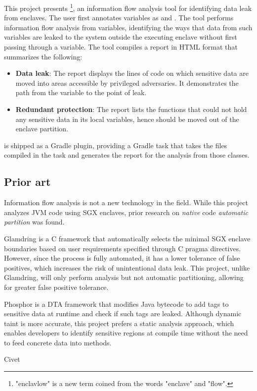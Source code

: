 This project presents \pname{}
\footnote{"enclavlow" is a new term coined from the words "enclave" and "flow".},
an information flow analysis tool
for identifying data leak from enclaves.
The user first annotates variables as  and .
The tool performs information flow analysis from  variables,
identifying the ways that data from such variables are leaked
to the system outside the executing enclave
without first passing through a  variable.
The tool compiles a report in HTML format that summarizes the following:
\begin{itemize}
	\item \textbf{Data leak}:
		The report displays the lines of code on which sensitive data are moved
		into areas accessible by privileged adversaries.
		It demonstrates the path from the  variable to the point of leak.
	\item \textbf{Redundant protection}:
		The report lists the functions that could not hold any sensitive data in its local variables,
		hence should be moved out of the enclave partition.
\end{itemize}

\pname{} is shipped as a Gradle plugin,
providing a Gradle task that
takes the  files compiled in the  task
and generates the report for the analysis from those classes.

\subsection{Prior art}
Information flow analysis is not a new technology in the field.
While this project analyzes JVM code using SGX enclaves,
prior research on \emph{native} code \emph{automatic partition} was found.

Glamdring \cite{glamdring} is a C framework that
automatically selects the minimal SGX enclave boundaries
based on user requirements specified through C pragma directives.
However, since the process is fully automated,
it has a lower tolerance of false positives,
which increases the risk of unintentional data leak.
This project, unlike Glamdring, will only perform analysis but not automatic partitioning,
allowing for greater false positive tolerance.

Phosphor \cite{BellJonathan2014Pidd} is a DTA framework
that modifies Java bytecode to add tags to sensitive data at runtime
and check if such tags are leaked.
Although dynamic taint is more accurate,
this project prefers a static analysis approach,
which enables developers to identify sensitive regions at compile time
without the need to feed concrete data into methods.

Civet \cite{civet}
